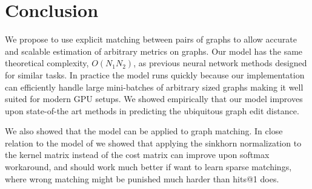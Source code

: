 \section{Conclusion}


We propose to use explicit matching between pairs of graphs to allow accurate and scalable estimation of arbitrary metrics on graphs. Our model has the same theoretical complexity, $O(N_1 N_2)$, as previous neural network methods designed for similar tasks. In practice the model runs quickly because our implementation can efficiently handle large mini-batches of arbitrary sized graphs making it well suited for modern GPU setups. We showed empirically that our model improves upon state-of-the art methods in predicting the ubiquitous graph edit distance.



We also showed that the model can be applied to graph matching. In close relation to the model of \cite{fey2020_update} we showed that applying the sinkhorn normalization to the kernel matrix instead of the cost matrix can improve upon softmax workaround, and should work much better if want to learn sparse matchings, where wrong matching might be punished much harder than hits@1 does. %
